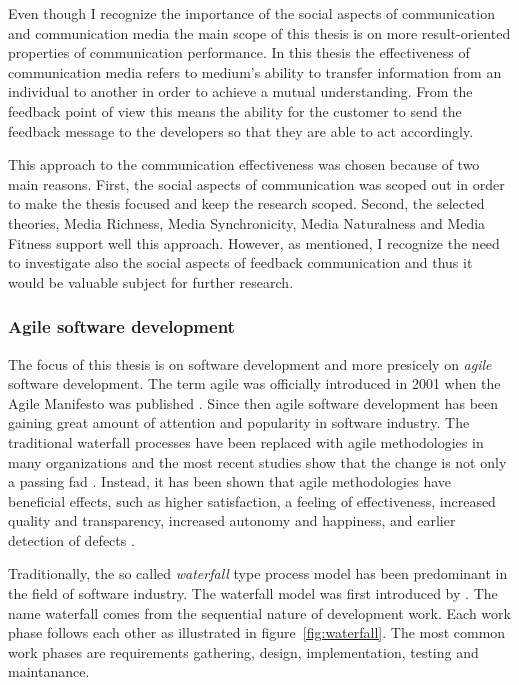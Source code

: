 \documentclass[english,12pt,a4paper,pdftex]{article}
\begin{document}
Even though I recognize the importance of the social aspects of communication and communication media the main scope of this thesis is on more result-oriented properties of communication performance. In this thesis the effectiveness of communication media refers to medium's ability to transfer information from an individual to another in order to achieve a mutual understanding. From the feedback point of view this means the ability for the customer to send the feedback message to the developers so that they are able to act accordingly.

This approach to the communication effectiveness was chosen because of two main reasons. First, the social aspects of communication was scoped out in order to make the thesis focused and keep the research scoped. Second, the selected theories, Media Richness, Media Synchronicity, Media Naturalness and Media Fitness support well this approach. However, as mentioned, I recognize the need to investigate also the social aspects of feedback communication and thus it would be valuable subject for further research.

\subsubsection{Agile software development}

The focus of this thesis is on software development and more presicely on \emph{agile} software development. The term agile was officially introduced in 2001 when the Agile Manifesto was published \citep{agilemanifesto}. Since then agile software development has been gaining great amount of attention and popularity in software industry. The traditional waterfall processes have been replaced with agile methodologies in many organizations and the most recent studies show that the change is not only a passing fad \citep{laanti2011}. Instead, it has been shown that agile methodologies have beneficial effects, such as higher satisfaction, a feeling of effectiveness, increased quality and transparency, increased autonomy and happiness, and earlier detection of defects \citep{korhonen2012}.

Traditionally, the so called \emph{waterfall} type process model has been predominant in the field of software industry. The waterfall model was first introduced by \citet{royce1970}. The name waterfall comes from the sequential nature of development work. Each work phase follows each other as illustrated in figure~\ref{fig:waterfall}. The most common work phases are requirements gathering, design, implementation, testing and maintanance.
\end{document}
